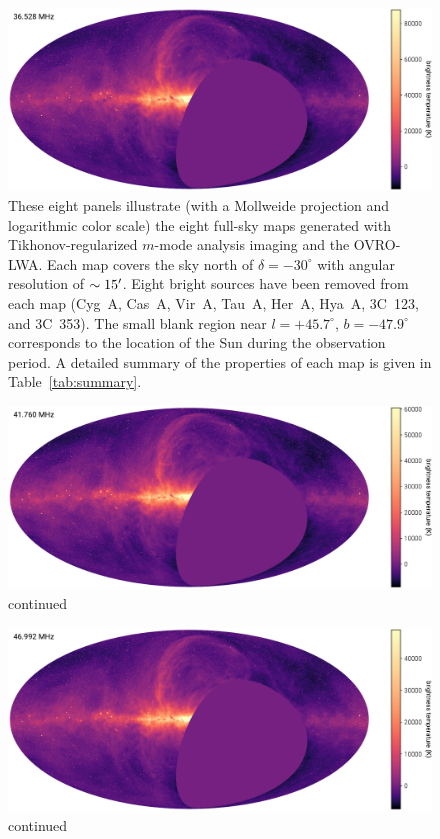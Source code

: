 \begin{bibunit}
\begin{figure}
    \centering
    \includegraphics[width=\textwidth]{figures/chapter3/spw04}
    \caption{
        These eight panels illustrate (with a Mollweide projection and logarithmic color scale) the
        eight full-sky maps generated with Tikhonov-regularized $m$-mode analysis imaging and the
        OVRO-LWA.  Each map covers the sky north of $\delta=-30^\circ$ with angular resolution of
        $\sim15\mbox{$^\prime$}$. Eight bright sources have been removed from each map (Cyg~A, Cas~A, Vir~A,
        Tau~A, Her~A, Hya~A, 3C~123, and 3C~353). The small blank region near $l=+45.7^\circ$,
        $b=-47.9^\circ$ corresponds to the location of the Sun during the observation period.  A
        detailed summary of the properties of each map is given in Table~\ref{tab:summary}.
    }
    \label{fig:channel-maps}
\end{figure}

\addtocounter{figure}{-1}
\begin{figure}
    \centering
    \includegraphics[width=\textwidth]{figures/chapter3/spw06}
    \caption{
        continued
    }
    \label{fig:channel-maps}
\end{figure}

\addtocounter{figure}{-1}
\begin{figure}
    \centering
    \includegraphics[width=\textwidth]{figures/chapter3/spw08}
    \caption{
        continued
    }
    \label{fig:channel-maps}
\end{figure}


\end{bibunit}

